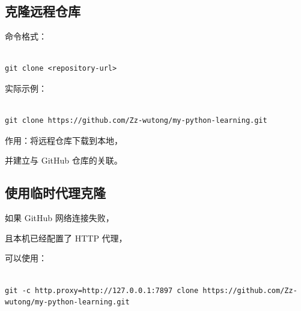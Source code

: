 



\subsection{克隆远程仓库}



命令格式：



\begin{lstlisting}

git clone <repository-url>

\end{lstlisting}



实际示例：



\begin{lstlisting}

git clone https://github.com/Zz-wutong/my-python-learning.git

\end{lstlisting}



作用：将远程仓库下载到本地，

并建立与 GitHub 仓库的关联。



\subsection{使用临时代理克隆}



如果 GitHub 网络连接失败，

且本机已经配置了 HTTP 代理，

可以使用：



\begin{lstlisting}

git -c http.proxy=http://127.0.0.1:7897 clone https://github.com/Zz-wutong/my-python-learning.git

\end{lstlisting}







